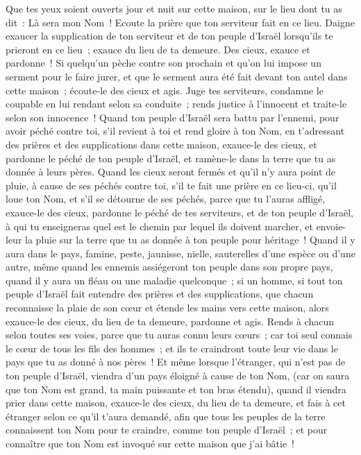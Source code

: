 \begin{multicols}{2}
Que tes yeux soient ouverts jour et nuit sur cette maison, sur le lieu dont tu as dit~: Là sera mon Nom~! Ecoute la prière que ton serviteur fait en ce lieu.
Daigne exaucer la supplication de ton serviteur et de ton peuple d'Israël lorsqu'ils te prieront en ce lieu~; exauce du lieu de ta demeure. Des cieux, exauce et pardonne~!
Si quelqu'un pèche contre son prochain et qu'on lui impose un serment pour le faire jurer, et que le serment aura été fait devant ton autel dans cette maison~;
écoute-le des cieux et agis. Juge tes serviteurs, condamne le coupable en lui rendant selon sa conduite~; rends justice à l'innocent et traite-le selon son innocence~!
Quand ton peuple d'Israël sera battu par l'ennemi, pour avoir péché contre toi, s'il revient à toi et rend gloire à ton Nom, en t'adressant des prières et des supplications dans cette maison,
exauce-le des cieux, et pardonne le péché de ton peuple d'Israël, et ramène-le dans la terre que tu as donnée à leurs pères.
Quand les cieux seront fermés et qu'il n'y aura point de pluie, à cause de ses péchés contre toi, s'il te fait une prière en ce lieu-ci, qu'il loue ton Nom, et s'il se détourne de ses péchés, parce que tu l'auras affligé,
exauce-le des cieux, pardonne le péché de tes serviteurs, et de ton peuple d'Israël, à qui tu enseigneras quel est le chemin par lequel ils doivent marcher, et envoie-leur la pluie sur la terre que tu as donnée à ton peuple pour héritage~!
Quand il y aura dans le pays, famine, peste, jaunisse, nielle, sauterelles d'une espèce ou d'une autre, même quand les ennemis assiégeront ton peuple dans son propre pays, quand il y aura un fléau ou une maladie quelconque~;
si un homme, si tout ton peuple d'Israël fait entendre des prières et des supplications, que chacun reconnaisse la plaie de son cœur et étende les mains vers cette maison,
alors exauce-le des cieux, du lieu de ta demeure, pardonne et agis. Rends à chacun selon toutes ses voies, parce que tu auras connu leurs cœurs~; car toi seul connais le cœur de tous les fils des hommes~;
et ils te craindront toute leur vie dans le pays que tu as donné à nos pères~!
Et même lorsque l'étranger, qui n'est pas de ton peuple d'Israël, viendra d'un pays éloigné à cause de ton Nom,
(car on saura que ton Nom est grand, ta main puissante et ton bras étendu), quand il viendra prier dans cette maison,
exauce-le des cieux, du lieu de ta demeure, et fais à cet étranger selon ce qu'il t'aura demandé, afin que tous les peuples de la terre connaissent ton Nom pour te craindre, comme ton peuple d'Israël~; et pour connaître que ton Nom est invoqué sur cette maison que j'ai bâtie~!

\end{multicols}

